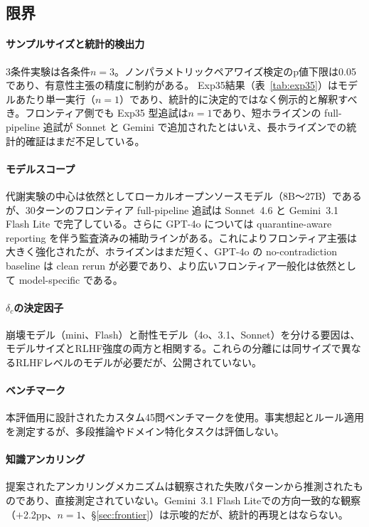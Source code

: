 \documentclass[11pt,a4paper]{article}
\begin{document}
\subsection{限界}

\paragraph{サンプルサイズと統計的検出力}
3条件実験は各条件$n = 3$。ノンパラメトリックペアワイズ検定のp値下限は0.05であり、有意性主張の精度に制約がある。
Exp35結果（表~\ref{tab:exp35}）はモデルあたり単一実行（$n = 1$）であり、統計的に決定的ではなく例示的と解釈すべき。フロンティア側でも Exp35 型追試は$n = 1$であり、短ホライズンの full-pipeline 追試が Sonnet と Gemini で追加されたとはいえ、長ホライズンでの統計的確証はまだ不足している。

\paragraph{モデルスコープ}
代謝実験の中心は依然としてローカルオープンソースモデル（8B〜27B）であるが、30ターンのフロンティア full-pipeline 追試は Sonnet~4.6 と Gemini~3.1 Flash Lite で完了している。さらに GPT-4o については quarantine-aware reporting を伴う監査済みの補助ラインがある。これによりフロンティア主張は大きく強化されたが、ホライズンはまだ短く、GPT-4o の no-contradiction baseline は clean rerun が必要であり、より広いフロンティア一般化は依然として model-specific である。

\paragraph{$\delta_c$の決定因子}
崩壊モデル（mini、Flash）と耐性モデル（4o、3.1、Sonnet）を分ける要因は、モデルサイズとRLHF強度の両方と相関する。これらの分離には同サイズで異なるRLHFレベルのモデルが必要だが、公開されていない。

\paragraph{ベンチマーク}
本評価用に設計されたカスタム45問ベンチマークを使用。事実想起とルール適用を測定するが、多段推論やドメイン特化タスクは評価しない。

\paragraph{知識アンカリング}
提案されたアンカリングメカニズムは観察された失敗パターンから推測されたものであり、直接測定されていない。Gemini~3.1 Flash Liteでの方向一致的な観察（$+$2.2pp、$n = 1$、\S\ref{sec:frontier}）は示唆的だが、統計的再現とはならない。
\end{document}
